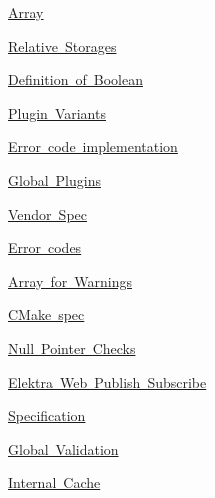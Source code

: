 \begin{DoxyItemize}
\item \mbox{\hyperlink{doc_decisions_array_md}{Array}}
\item \mbox{\hyperlink{doc_decisions_relative_md}{Relative Storages}}
\item \mbox{\hyperlink{doc_decisions_boolean_md}{Definition of Boolean}}
\item \mbox{\hyperlink{doc_decisions_plugin_variants_md}{Plugin Variants}}
\item \mbox{\hyperlink{doc_decisions_error_code_implementation_md}{Error code implementation}}
\end{DoxyItemize}


\begin{DoxyItemize}
\item \mbox{\hyperlink{doc_decisions_global_plugins_md}{Global Plugins}}
\item \mbox{\hyperlink{doc_decisions_vendor_spec_md}{Vendor Spec}}
\item \mbox{\hyperlink{doc_decisions_error_codes_md}{Error codes}}
\item \mbox{\hyperlink{doc_decisions_warning-array_md}{Array for Warnings}}
\end{DoxyItemize}


\begin{DoxyItemize}
\item \mbox{\hyperlink{doc_decisions_cmake_spec_md}{C\+Make spec}}
\item \mbox{\hyperlink{doc_decisions_null_pointer_checks_md}{Null Pointer Checks}}
\item \mbox{\hyperlink{doc_decisions_elektra_web_pubsub_md}{Elektra Web Publish Subscribe}}
\end{DoxyItemize}


\begin{DoxyItemize}
\item \mbox{\hyperlink{doc_decisions_specification_md}{Specification}}
\item \mbox{\hyperlink{doc_decisions_global_validation_md}{Global Validation}}
\item \mbox{\hyperlink{doc_decisions_internal_cache_md}{Internal Cache}} 
\end{DoxyItemize}